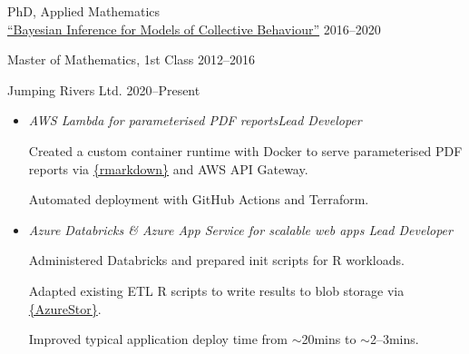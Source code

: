 \documentclass[12pt, a4paper]{article}
\begin{document}

\makecard




%
        {PhD, Applied Mathematics\\
         \href{https://jwalton.info/assets/thesis.pdf}%
     {{\footnotesize{}}``Bayesian Inference for Models of Collective Behaviour''}}%
        {2016--2020}

%
        {Master of Mathematics, 1st Class}%
        {2012--2016}



%
        {Jumping Rivers Ltd.}%
        {2020--Present}

\vspace{-1em}


\begin{itemize}[
    itemsep=.05em,
    labelwidth=2em,
    leftmargin=1.5em,
    topsep=0em]

    \item[]  
                   {\emph{AWS Lambda for parameterised PDF reports\hfill{}Lead Developer}

                    \sloppy{}Created a custom container runtime with Docker to serve
                    parameterised PDF reports via
                    \href{https://rmarkdown.rstudio.com/}{\{rmarkdown\}} and
                    AWS API Gateway.

                    Automated deployment with GitHub Actions and Terraform.}%

    \item[]  
                   {\emph{Azure Databricks \& Azure App Service for scalable web apps
                    \hfill{}Lead Developer}

                    Administered Databricks and prepared init scripts for R workloads.

                    Adapted existing ETL R scripts to write results to blob storage via
                    \href{https://cran.r-project.org/web/packages/AzureStor/vignettes/intro.html}%
                         {\{AzureStor\}}.

                    Improved typical application deploy time from $\sim$20mins to $\sim$2--3mins.}%

\end{itemize}
\end{document}
